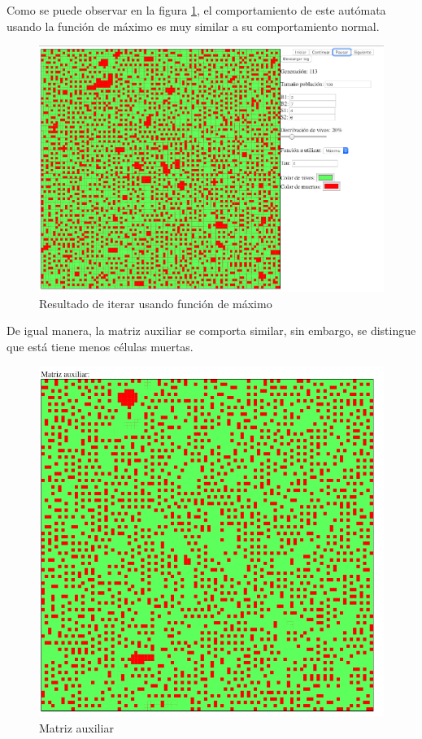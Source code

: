 	Como se puede observar en la figura \ref{fig:golm2}, el comportamiento de este autómata usando la función de máximo es muy similar a su comportamiento normal.
	\begin{figure}[H]
		\begin{center}
			\includegraphics[scale=.3]{GOLM/img/regla2746-1.png}
			\caption{Resultado de iterar usando función de máximo}
			\label{fig:golm2}
		\end{center}
	\end{figure}

	De igual manera, la matriz auxiliar se comporta similar, sin embargo, se distingue que está tiene menos células muertas.
	\begin{figure}[H]
		\begin{center}
			\includegraphics[scale=.3]{GOLM/img/regla2746-1-1.png}
			\caption{Matriz auxiliar}
			\label{fig:golm3}
		\end{center}
	\end{figure}

